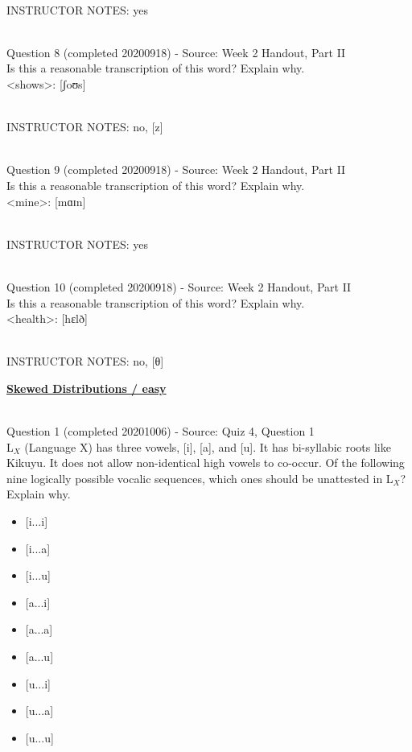 \documentclass[12pt]{article}
\begin{document}
~\\
INSTRUCTOR NOTES: yes


~\\

{\large Question 8} (completed 20200918) - Source: Week 2 Handout, Part II\\

Is this a reasonable transcription of this word? Explain why.\\

<shows>: {[ʃoʊs]}


~\\
INSTRUCTOR NOTES: no, [z]


~\\

{\large Question 9} (completed 20200918) - Source: Week 2 Handout, Part II\\

Is this a reasonable transcription of this word? Explain why.\\

<mine>: {[mɑɪn]}


~\\
INSTRUCTOR NOTES: yes


~\\

{\large Question 10} (completed 20200918) - Source: Week 2 Handout, Part II\\

Is this a reasonable transcription of this word? Explain why.\\

<health>: {[hɛlð]}


~\\
INSTRUCTOR NOTES: no, [θ]


\newpage\textbf{\underline{\huge Skewed Distributions / easy\\}}

~\\

{\large Question 1} (completed 20201006) - Source: Quiz 4, Question 1\\

L$_X$ (Language X) has three vowels, [i], [a], and [u]. It has bi-syllabic roots like Kikuyu. It does not allow non-identical high vowels to co-occur. Of the following nine logically possible vocalic sequences, which ones should be unattested in L$_X$? Explain why.\\

\begin{itemize} \item {[i...i]} \item {[i...a]} \item {[i...u]} \item {[a...i]} \item {[a...a]} \item {[a...u]} \item {[u...i]} \item {[u...a]} \item {[u...u]} \end{itemize}
\end{document}
